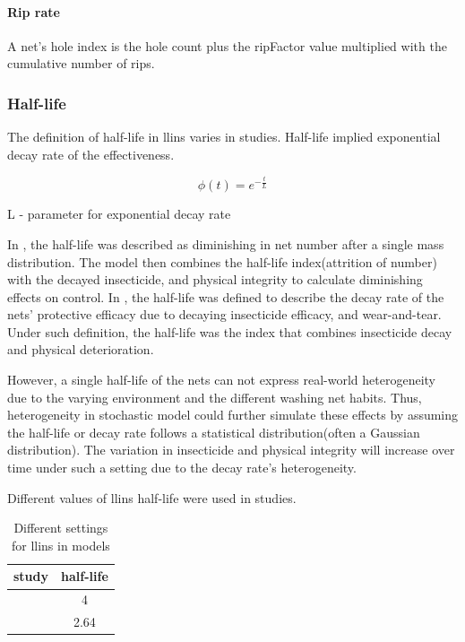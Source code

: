 \documentclass[a4paper, 12pt, twoside]{article}
\begin{document}
\paragraph{Rip rate}%
\label{par:rip_rate}
A net’s hole index is the hole count plus the ripFactor value multiplied with the cumulative number of rips.

\subsubsection{Half-life}
\label{par:half_life}
The definition of half-life in \gls{llins} varies in studies.
Half-life implied exponential decay rate of the effectiveness.

\begin{equation}
  \phi(t) = e^{- \frac{t}{L} }
\end{equation}
\begin{center}
  L - parameter for exponential decay rate
\end{center}

In \cite{Briet2013}, the half-life was described as diminishing in net number after a single mass distribution.
The model then combines the half-life index(attrition of number) with the decayed insecticide, and physical integrity to calculate diminishing effects on control.
In \cite{Griffin2010}, the half-life was defined to describe the decay rate of the nets' protective efficacy due to decaying insecticide efficacy, and wear-and-tear.
Under such definition, the half-life was the index that combines insecticide decay and physical deterioration.

However, a single half-life of the nets can not express real-world heterogeneity due to the varying environment and the different washing net habits.
Thus, heterogeneity in stochastic model could further simulate these effects by assuming the half-life or decay rate follows a statistical distribution(often a Gaussian distribution).
The variation in insecticide and physical integrity will increase over time under such a setting due to the decay rate's heterogeneity.

Different values of \gls{llins} half-life were used in studies.

\begin{table}[htpb]
  \centering
  \caption{Different settings for \gls{llins} in models}
  \label{tab:different_settings_for_llins}
  \begin{tabular}{cS}
  \toprule
  study & {half-life} \\
  \midrule
  \cite{Briet2013} & 4 \\
  \cite{Griffin2010} & 2.64 \\
  \bottomrule
  \end{tabular}
\end{table}
\end{document}
